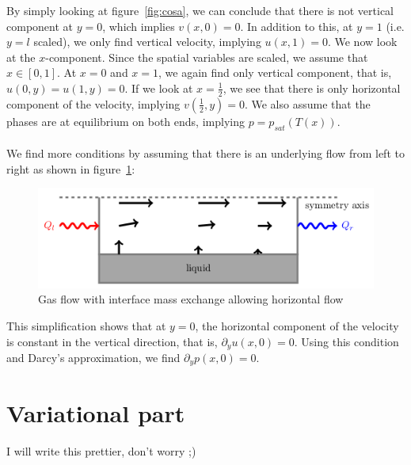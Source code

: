 \documentclass{article}
\begin{document}
\noindent By simply looking at figure~\ref{fig:cosa}, we can conclude that there is not vertical component at $y = 0$, which implies \underline{$v(x,0) = 0$}. In addition to this, at $y = 1$ (i.e. $y=l$ scaled), we only find vertical velocity, implying \underline{$u(x,1) = 0$}. We now look at the $x$-component. Since the spatial variables are scaled, we assume that $x \in [0,1]$. At $x=0$ and $x=1$, we again find only vertical component, that is, \underline{$u(0,y) = u(1,y) = 0$}. If we look at $x = \frac{1}{2}$, we see that there is only horizontal component of the velocity, implying \underline{$v(\frac{1}{2},y) = 0$}.
We also assume that the phases are at equilibrium on both ends, implying \underline{$p = p_{sat}(T(x))$}.\\\\
We find more conditions by assuming that there is an underlying flow from left to right as shown in figure~\ref{fig:cosa2}:
\begin{figure}[H]
\centering
\includegraphics[width=0.7\linewidth]{cosa2}
\caption{Gas flow with interface mass exchange allowing horizontal flow}
\label{fig:cosa2}
\end{figure}

\noindent This simplification shows that at $y=0$, the horizontal component of the velocity is constant in the vertical direction, that is, \underline{$\partial_{y}u(x,0)=0$}. Using this condition and Darcy's approximation, we find \underline{$\partial_{y}p(x,0)=0$}.










\section{Variational part}

I will write this prettier, don't worry ;)
\end{document}
